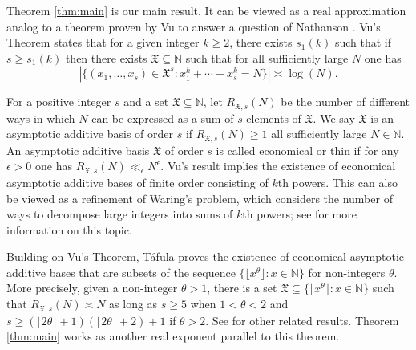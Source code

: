 \documentclass[11pt,reqno]{amsart}
\numberwithin{equation}{section}
\begin{document}
Theorem \ref{thm:main} is our main result. It can be viewed as a real approximation analog to a theorem proven by Vu \cite{VuRef} to answer a question of Nathanson \cite{Nat}. Vu's Theorem states that for a given integer $k \geq 2$, there exists $s_1(k)$ such that if $s \geq s_1(k)$ then there exists $\mathfrak{X} \subseteq \mathbb{N}$ such that for all sufficiently large $N$ one has
\[ |\{(x_1,\ldots,x_s) \in \mathfrak{X}^s: x_1^k+\cdots+x_s^k = N\}| \asymp \log(N). \]

For a positive integer $s$ and a set $\mathfrak{X} \subseteq \mathbb{N} $, let $R_{\mathfrak{X},s}(N)$ be the number of different ways in which $N$ can be expressed as a sum of $s$ elements of $\mathfrak{X}$. We say $\mathfrak{X}$ is an asymptotic additive basis of order $s$ if $R_{\mathfrak{X},s}(N) \geq 1$ all sufficiently large $N \in \mathbb{N}$. An asymptotic additive basis $\mathfrak{X}$ of order $s$ is called economical or thin if for any $\epsilon > 0$ one has $R_{\mathfrak{X}, s}(N) \ll_{\epsilon} N^{\epsilon}$. Vu's result implies the existence of economical asymptotic additive bases of finite order consisting of $k$th powers. This can also be viewed as a refinement of Waring's problem, which considers the number of ways to decompose large integers into sums of $k$th powers; see \cite{VWSurvey} for more information on this topic. 

Building on Vu's Theorem, T\'{a}fula \cite{taf26} proves the existence of economical asymptotic additive bases that are subsets of the sequence $\{ \lfloor x^{\theta} \rfloor: x \in \mathbb{N} \}$ for non-integers $\theta$. More precisely, given a non-integer $\theta > 1$, there is a set $\mathfrak{X} \subseteq \{ \lfloor x^{\theta} \rfloor: x \in \mathbb{N} \}$ such that $R_{\mathfrak{X},s}(N) \asymp N$ 
as long as $s \geq 5$ when $1 < \theta < 2$ and $s \geq (\lfloor 2\theta \rfloor +1)(\lfloor 2\theta \rfloor +2)+1$ if $\theta > 2$. See \cite{taf26} for other related results. Theorem \ref{thm:main} works as another real exponent parallel to this theorem. 
\end{document}
